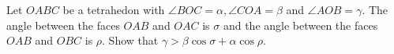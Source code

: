 Let \(OABC\) be a tetrahedon with \(\angle BOC=\alpha,\angle COA =\beta\) and \(\angle AOB =\gamma\). The angle between the faces \(OAB\) and \(OAC\) is \(\sigma\) and the angle between the faces \(OAB\) and \(OBC\) is \(\rho\).
Show that \(\gamma > \beta \cos\sigma + \alpha \cos\rho\).